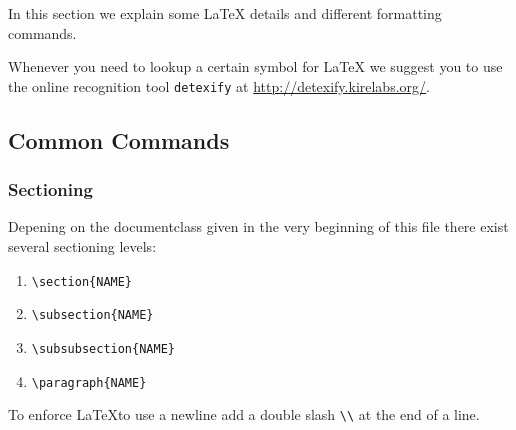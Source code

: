 \documentclass[10pt,a4paper]{scrartcl}
\begin{document}
In this section we explain some \LaTeX\xspace details and different formatting
commands.

Whenever you need to lookup a certain symbol for \LaTeX\xspace we suggest you to use
the online recognition tool \texttt{detexify} at \url{http://detexify.kirelabs.org/}.


\subsection{Common Commands}
\subsubsection{Sectioning}
Depening on the documentclass given in the very beginning of this file there
exist several sectioning levels:
\begin{enumerate}
	\item{} \verb$\section{NAME}$
	\item{} \verb$\subsection{NAME}$
	\item{} \verb$\subsubsection{NAME}$
	\item{} \verb$\paragraph{NAME}$
\end{enumerate}

\noindent To enforce \LaTeX to use a newline add a double slash \verb$\\$ at 
the end of a line.
\end{document}
